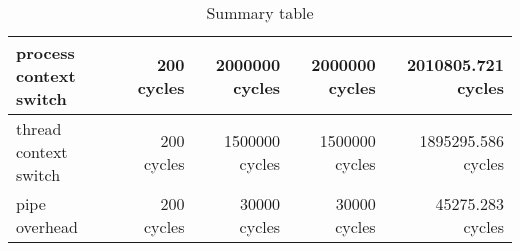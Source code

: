 \begin{table}[h]
\begin{center}
\begin{tabular}{| l | r | r | r | r |}
process context switch 	& 200 cycles		&	2000000 cycles	&2000000 cycles	& 2010805.721 cycles \\
\hline
thread context switch 	& 200 cycles		&	1500000 cycles	&1500000 cycles	& 1895295.586 cycles \\ 
\hline
pipe overhead			& 200 cycles		&	30000 cycles	&30000 cycles	& 45275.283 cycles \\ 
\hline\hline


















\end{tabular}
\end{center}






\caption{Summary table}

\end{table}

